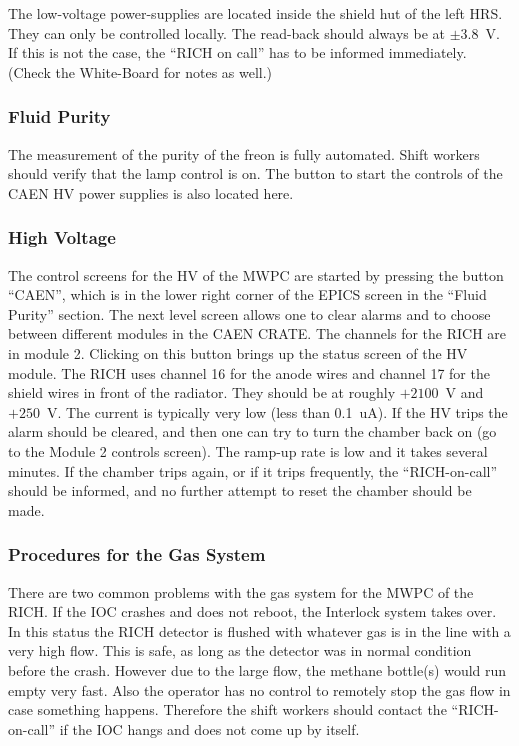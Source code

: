 {The low-voltage power-supplies are located inside the shield hut of the 
left HRS. They can only be controlled locally. 
The read-back should always
be at $\pm$3.8~V. If this is not the case, the 
``RICH on call'' has to be informed immediately.
(Check the White-Board for notes as well.)

\subsubsection{Fluid Purity}

The measurement of the purity of the freon is fully automated.
Shift workers should verify that the lamp control is on.
The button to start the controls of the CAEN HV power supplies 
is also located here.

\subsubsection{High Voltage}

The control screens for the HV of the MWPC
are started by pressing the button ``CAEN'', which is 
in the lower right corner of the EPICS screen
in the ``Fluid Purity'' section. 
The next level screen allows one to clear alarms and to choose between
different modules in the CAEN CRATE. The channels for the RICH are in
module 2. Clicking on this button brings up the status screen of the 
HV module. The RICH uses channel 16 for the anode wires and channel
17 for the shield wires in front of the radiator. They should be at
roughly $+2100$~V and $+250$~V. The current is typically very low (less
than 0.1~uA). If the HV trips the alarm should be cleared,
and then one can try to turn the chamber back on (go to the 
Module 2 controls screen). The ramp-up rate is low and it takes
several minutes. If the chamber trips again, or if it trips frequently, 
the ``RICH-on-call''
should be informed, and no further attempt to reset the chamber should
be made.

\subsubsection{Procedures for the Gas System}
\label{sec:rich_measures}

There are two common problems with the gas system for the 
MWPC of the RICH. If the IOC crashes and does not reboot,
the Interlock system takes over. In this status the 
RICH detector is flushed with whatever gas is in the line
with a very high flow. This is safe, as long as the detector
was in normal condition before the crash. However due to the 
large flow, the methane bottle(s) would run empty very fast.
Also the operator has no control to remotely stop the gas flow
in case something happens. Therefore the shift workers should 
contact the ``RICH-on-call'' if the IOC hangs and does not come 
up by itself.

}
